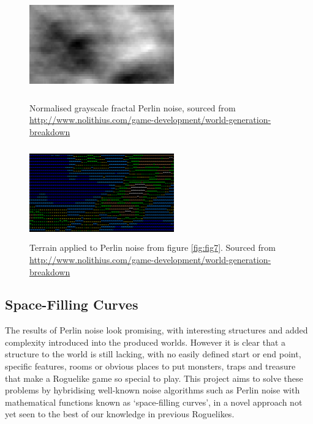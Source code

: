 \documentclass[12pt,a4paper]{article}
\begin{document}
\begin{figure}[h]
\begin{minipage}{.5\textwidth}
  	\centering
 	\includegraphics[width=6.25cm,height=4cm]{images/perlin2.png}
	\caption[]{Normalised grayscale fractal Perlin noise, sourced from \url{http://www.nolithius.com/game-development/world-generation-breakdown}}
	\label{fig:fig7}
	\end{minipage}
	\begin{minipage}{.5\textwidth}
 	\centering
 	\includegraphics[width=6.25cm,height=4cm]{images/terrain.png}
	\caption[]{Terrain applied to Perlin noise from figure \ref{fig:fig7}. Sourced from \url{http://www.nolithius.com/game-development/world-generation-breakdown}}
	\label{fig:fig8}
\end{minipage}
\end{figure}


\subsection{Space-Filling Curves}

The results of Perlin noise look promising, with interesting structures and added complexity introduced into the produced worlds. However it is clear that a structure to the world is still lacking, with no easily defined start or end point, specific features, rooms or obvious places to put monsters, traps and treasure that make a Roguelike game so special to play. This project aims to solve these problems by hybridising well-known noise algorithms such as Perlin noise with mathematical functions known as `space-filling curves', in a novel approach not yet seen to the best of our knowledge in previous Roguelikes.\\
\end{document}
